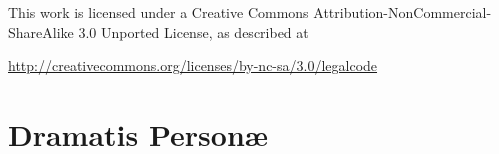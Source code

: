 \documentclass[11pt,final]{book}
\begin{document}
\vspace{1in}

\noindent This work is licensed under a Creative Commons Attribution-NonCommercial-ShareAlike 3.0 Unported License, as described at \newline

\noindent \footnotesize \url{http://creativecommons.org/licenses/by-nc-sa/3.0/legalcode}







   \chapter*{Dramatis Person\ae}
\end{document}
